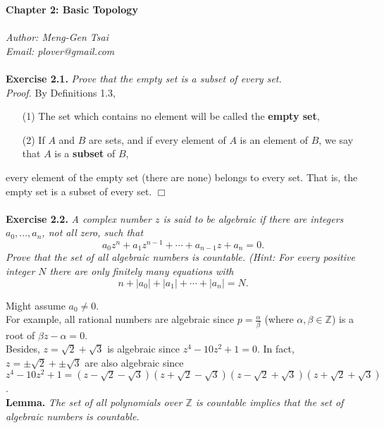 \documentclass{article}
\begin{document}
\textbf{\Large Chapter 2: Basic Topology} \\\\



\emph{Author: Meng-Gen Tsai} \\
\emph{Email: plover@gmail.com} \\\\



\textbf{Exercise 2.1.}
\emph{Prove that the empty set is a subset of every set.} \\

\emph{Proof.}
By Definitions 1.3,
\begin{enumerate}
\item[(1)]
The set which contains no element will be called the \textbf{empty set},
\item[(2)]
If $A$ and $B$ are sets, and if every element of $A$ is an element of $B$,
we say that $A$ is a \textbf{subset} of $B$,
\end{enumerate}
every element of the empty set (there are none) belongs to every set.
That is, the empty set is a subset of every set.
$\Box$ \\\\



\textbf{Exercise 2.2.}
\emph{A complex number $z$ is said to be algebraic if there are integers
$a_0, ..., a_n$, not all zero, such that
$$a_0 z^n + a_1 z^{n-1} + \cdots + a_{n-1} z + a_n = 0.$$
Prove that the set of all algebraic numbers is countable.
(Hint: For every positive integer $N$ there are only finitely many equations with
$$n + |a_0| + |a_1| + \cdots + |a_n| = N.$$}

Might assume $a_0 \neq 0$. \\

For example, all rational numbers are algebraic
since $p = \frac{\alpha}{\beta}$ (where $\alpha, \beta \in \mathbb{Z}$)
is a root of $\beta z - \alpha = 0$. \\

Besides, $z = \sqrt{2} + \sqrt{3}$ is algebraic since $z^4 - 10z^2 + 1 = 0$.
In fact, $z = \pm\sqrt{2} + \pm\sqrt{3}$ are also algebraic since
$z^4 - 10z^2 + 1 =
(z - \sqrt{2} - \sqrt{3})(z + \sqrt{2} - \sqrt{3})
(z - \sqrt{2} + \sqrt{3})(z + \sqrt{2} + \sqrt{3})$. \\

\textbf{Lemma.}
\emph{The set of all polynomials over $\mathbb{Z}$ is countable implies that
the set of algebraic numbers is countable.} \\
\end{document}
